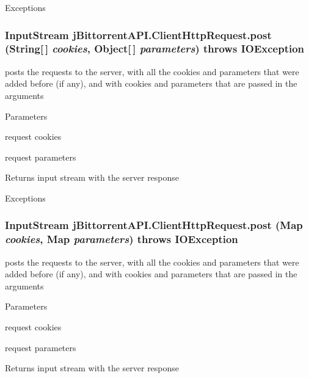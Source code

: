 \begin{DoxyExceptions}{Exceptions}
\item[{\em IOException}]\end{DoxyExceptions}
\hypertarget{classj_bittorrent_a_p_i_1_1_client_http_request_a5672c2238a4736a14b0a1af6ee86f527}{
\subsubsection[{post}]{\setlength{\rightskip}{0pt plus 5cm}InputStream jBittorrentAPI.ClientHttpRequest.post (String\mbox{[}$\,$\mbox{]} {\em cookies}, \/  Object\mbox{[}$\,$\mbox{]} {\em parameters})  throws IOException }}
\label{classj_bittorrent_a_p_i_1_1_client_http_request_a5672c2238a4736a14b0a1af6ee86f527}
posts the requests to the server, with all the cookies and parameters that were added before (if any), and with cookies and parameters that are passed in the arguments 
\begin{DoxyParams}{Parameters}
\item[{\em cookies}]request cookies \item[{\em parameters}]request parameters \end{DoxyParams}
\begin{DoxyReturn}{Returns}
input stream with the server response 
\end{DoxyReturn}

\begin{DoxyExceptions}{Exceptions}
\item[{\em IOException}]\end{DoxyExceptions}
\hypertarget{classj_bittorrent_a_p_i_1_1_client_http_request_a0fd28a0cb6aaf88318874f7aaea31092}{
\subsubsection[{post}]{\setlength{\rightskip}{0pt plus 5cm}InputStream jBittorrentAPI.ClientHttpRequest.post (Map {\em cookies}, \/  Map {\em parameters})  throws IOException }}
\label{classj_bittorrent_a_p_i_1_1_client_http_request_a0fd28a0cb6aaf88318874f7aaea31092}
posts the requests to the server, with all the cookies and parameters that were added before (if any), and with cookies and parameters that are passed in the arguments 
\begin{DoxyParams}{Parameters}
\item[{\em cookies}]request cookies \item[{\em parameters}]request parameters \end{DoxyParams}
\begin{DoxyReturn}{Returns}
input stream with the server response 
\end{DoxyReturn}


